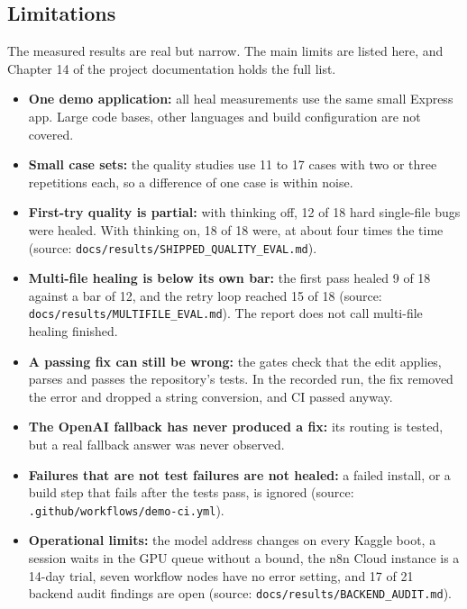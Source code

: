 \subsection{Limitations}

The measured results are real but narrow. The main limits are listed here, and Chapter 14 of the project documentation holds the full list.

\begin{itemize}
  \item \textbf{One demo application:} all heal measurements use the same small Express app. Large code bases, other languages and build configuration are not covered.
  \item \textbf{Small case sets:} the quality studies use 11 to 17 cases with two or three repetitions each, so a difference of one case is within noise.
  \item \textbf{First-try quality is partial:} with thinking off, 12 of 18 hard single-file bugs were healed. With thinking on, 18 of 18 were, at about four times the time (source: \texttt{docs/\allowbreak{}results/\allowbreak{}SHIPPED\_\allowbreak{}QUALITY\_\allowbreak{}EVAL.md}).
  \item \textbf{Multi-file healing is below its own bar:} the first pass healed 9 of 18 against a bar of 12, and the retry loop reached 15 of 18 (source: \texttt{docs/\allowbreak{}results/\allowbreak{}MULTIFILE\_\allowbreak{}EVAL.md}). The report does not call multi-file healing finished.
  \item \textbf{A passing fix can still be wrong:} the gates check that the edit applies, parses and passes the repository's tests. In the recorded run, the fix removed the error and dropped a string conversion, and CI passed anyway.
  \item \textbf{The OpenAI fallback has never produced a fix:} its routing is tested, but a real fallback answer was never observed.
  \item \textbf{Failures that are not test failures are not healed:} a failed install, or a build step that fails after the tests pass, is ignored (source: \texttt{.github/\allowbreak{}workflows/\allowbreak{}demo-ci.yml}).
  \item \textbf{Operational limits:} the model address changes on every Kaggle boot, a session waits in the GPU queue without a bound, the n8n Cloud instance is a 14-day trial, seven workflow nodes have no error setting, and 17 of 21 backend audit findings are open (source: \texttt{docs/\allowbreak{}results/\allowbreak{}BACKEND\_\allowbreak{}AUDIT.md}).
\end{itemize}

